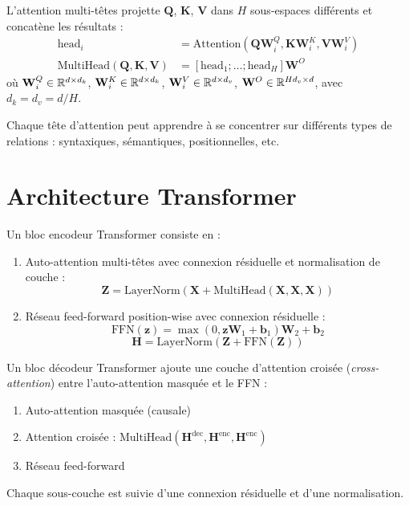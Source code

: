 \begin{definition}
L'attention multi-t\^etes projette $\mathbf{Q}$, $\mathbf{K}$, $\mathbf{V}$
dans $H$ sous-espaces diff\'erents et concat\`ene les r\'esultats :
\begin{align}
\text{head}_i &= \text{Attention}(\mathbf{Q}\mathbf{W}_i^Q, \mathbf{K}\mathbf{W}_i^K, \mathbf{V}\mathbf{W}_i^V) \\
\text{MultiHead}(\mathbf{Q}, \mathbf{K}, \mathbf{V}) &= [\text{head}_1; \ldots; \text{head}_H] \mathbf{W}^O
\end{align}
o\`u $\mathbf{W}_i^Q \in \mathbb{R}^{d \times d_k}$, $\mathbf{W}_i^K \in \mathbb{R}^{d \times d_k}$,
$\mathbf{W}_i^V \in \mathbb{R}^{d \times d_v}$, $\mathbf{W}^O \in \mathbb{R}^{Hd_v \times d}$,
avec $d_k = d_v = d/H$.
\end{definition}

\begin{remarque}
Chaque t\^ete d'attention peut apprendre \`a se concentrer sur diff\'erents
types de relations : syntaxiques, s\'emantiques, positionnelles, etc.
\end{remarque}

\section{Architecture Transformer}
\label{sec:att:transformer}

\begin{definition}
Un bloc encodeur Transformer consiste en :
\begin{enumerate}
    \item Auto-attention multi-t\^etes avec connexion r\'esiduelle et
          normalisation de couche :
          \[
          \mathbf{Z} = \text{LayerNorm}(\mathbf{X} + \text{MultiHead}(\mathbf{X}, \mathbf{X}, \mathbf{X}))
          \]
    \item R\'eseau feed-forward position-wise avec connexion r\'esiduelle :
          \[
          \text{FFN}(\mathbf{z}) = \max(0, \mathbf{z}\mathbf{W}_1 + \mathbf{b}_1)\mathbf{W}_2 + \mathbf{b}_2
          \]
          \[
          \mathbf{H} = \text{LayerNorm}(\mathbf{Z} + \text{FFN}(\mathbf{Z}))
          \]
\end{enumerate}
\end{definition}

\begin{definition}
Un bloc d\'ecodeur Transformer ajoute une couche d'attention crois\'ee
(\emph{cross-attention}) entre l'auto-attention masqu\'ee et le FFN :
\begin{enumerate}
    \item Auto-attention masqu\'ee (causale)
    \item Attention crois\'ee : $\text{MultiHead}(\mathbf{H}^{\text{dec}}, \mathbf{H}^{\text{enc}}, \mathbf{H}^{\text{enc}})$
    \item R\'eseau feed-forward
\end{enumerate}
Chaque sous-couche est suivie d'une connexion r\'esiduelle et d'une normalisation.
\end{definition}

